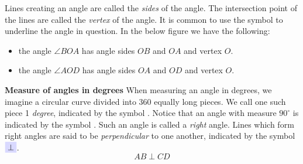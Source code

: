 Lines creating an angle are called the \textit{sides} of the angle. The intersection point of the lines are called the  \textit{vertex} of the angle. It is common to use the symbol \sym{$ \angle $} to underline the angle in question. In the below figure we have the following:
\begin{itemize}
\item the angle $ \angle BOA $  has angle sides $ OB $ and $ OA $ and vertex $ O $.
\item the angle $ \angle AOD $  has angle sides $ OA $ and $ OD $ and vertex $ O $.	
\end{itemize}
\newpage
\textbf{Measure of angles in degrees}\os
When measuring an angle in degrees, we imagine a circular curve divided into 360 equally long pieces. We call one such piece 1 \textit{degree}, indicated by the symbol \sym{$ ^\circ $}. 
 \vsk
Notice that an angle with measure $ 90^\circ $ is indicated by the symbol \sym{$ \square $}. Such an angle is called a \textit{right} angle. Lines which form right angles are said to be \textit{perpendicular} to one another, indicated by the symbol $ \sym{$ \perp $} $.
\[ AB\perp CD \]
\newpage
{}\vsk
\label{vinkelend}
\newpage
{}

